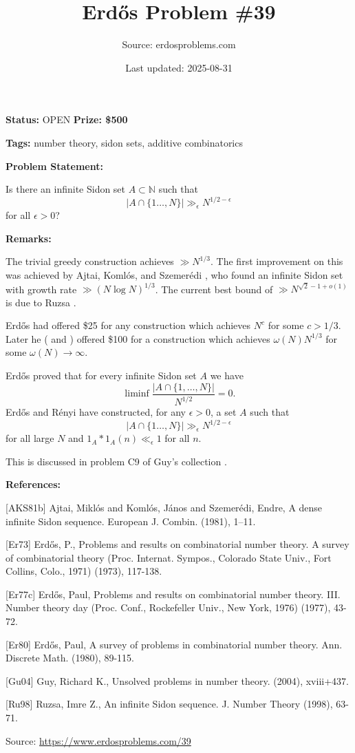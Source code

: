 \documentclass{article}
\title{Erd\H{o}s Problem \#39}
\date{Last updated: 2025-08-31}
\author{Source: erdosproblems.com}
\begin{document}
\maketitle

\noindent\textbf{Status:} OPEN \quad \textbf{Prize: \$500}

\noindent\textbf{Tags:} number theory, sidon sets, additive combinatorics

\medskip
\noindent\textbf{Problem Statement:}

Is there an infinite Sidon set $A\subset \mathbb{N}$ such that\[\lvert A\cap \{1\ldots,N\}\rvert \gg_\epsilon N^{1/2-\epsilon}\]for all $\epsilon>0$?

\bigskip
\noindent\textbf{Remarks:}

The trivial greedy construction achieves $\gg N^{1/3}$. The first improvement on this was achieved by Ajtai, Koml\'{o}s, and Szemer\'{e}di \cite{AKS81b}, who found an infinite Sidon set with growth rate $\gg (N\log N)^{1/3}$. The current best bound of $\gg N^{\sqrt{2}-1+o(1)}$ is due to Ruzsa \cite{Ru98}. 

Erd\H{o}s \cite{Er73} had offered \$25 for any construction which achieves $N^{c}$ for some $c>1/3$. Later he (\cite{Er77c} and \cite{Er80}) offered \$100 for a construction which achieves $\omega(N)N^{1/3}$ for some $\omega(N)\to \infty$.

Erd\H{o}s proved that for every infinite Sidon set $A$ we have\[\liminf \frac{\lvert A\cap \{1,\ldots,N\}\rvert}{N^{1/2}}=0.\]Erd\H{o}s and R\'{e}nyi have constructed, for any $\epsilon>0$, a set $A$ such that\[\lvert A\cap \{1\ldots,N\}\rvert \gg_\epsilon N^{1/2-\epsilon}\]for all large $N$ and $1_A\ast 1_A(n)\ll_\epsilon 1$ for all $n$.

This is discussed in problem C9 of Guy's collection \cite{Gu04}.

\bigskip
\noindent\textbf{References:}

[AKS81b] Ajtai, Mikl\'os and Koml\'os, J\'{a}nos and Szemer\'{e}di, Endre, A dense infinite Sidon sequence. European J. Combin. (1981), 1--11.
 
 [Er73] Erd\H{o}s, P., Problems and results on combinatorial number theory. A survey of combinatorial theory (Proc. Internat. Sympos., Colorado State Univ., Fort Collins, Colo., 1971) (1973), 117-138.
 
 [Er77c] Erd\H{o}s, Paul, Problems and results on combinatorial number theory. III. Number theory day (Proc. Conf., Rockefeller Univ.,
New York, 1976) (1977), 43-72.
 
 [Er80] Erd\H{o}s, Paul, A survey of problems in combinatorial number theory. Ann. Discrete Math. (1980), 89-115.
 
 [Gu04] Guy, Richard K., Unsolved problems in number theory. (2004), xviii+437.
 
 [Ru98] Ruzsa, Imre Z., An infinite Sidon sequence. J. Number Theory (1998), 63-71.

\bigskip
\noindent\small{Source: \url{https://www.erdosproblems.com/39}}
\end{document}
